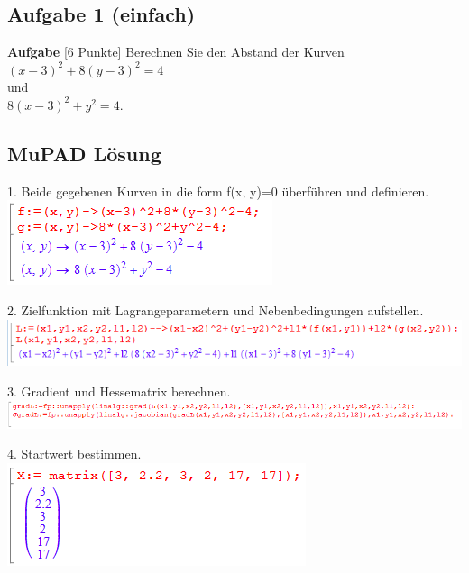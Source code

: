 \documentclass[11pt,final]{scrreprt}
\newcommand{\br} {\medskip\\}
\begin{document}
\subsection{Aufgabe 1 (einfach)}

\textbf{Aufgabe} [6 Punkte] Berechnen Sie den Abstand der Kurven\br
$(x-3)^2+8(y-3)^2=4$\br
und\\
$8(x-3)^2+y^2=4$.\\

\subsection{MuPAD Lösung}

1. Beide gegebenen Kurven in die form f(x, y)=0 überführen und definieren.\\

\includegraphics[scale=2.2]{images/abstandsproblem2/param.png}

2. Zielfunktion mit Lagrangeparametern und Nebenbedingungen aufstellen.\\

\includegraphics[scale=2.2]{images/abstandsproblem2/zielfkt.png}

3. Gradient und Hessematrix berechnen.\\

\includegraphics[width=15cm]{images/abstandsproblem2/grad.png}

4. Startwert bestimmen.\\

\includegraphics[scale=2.2]{images/abstandsproblem2/start.png}
\end{document}
